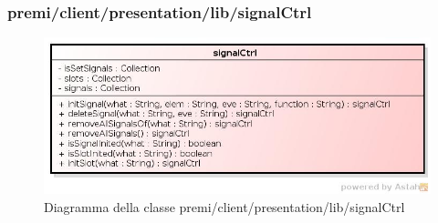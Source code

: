 \subsubsection{premi/client/presentation/lib/signalCtrl}
\begin{figure}[H]
\begin{center}
\includegraphics[scale=0.55]{img/diacla/signalCtrl.jpg}
\caption{Diagramma della classe premi/client/presentation/lib/signalCtrl}
\end{center}
\end{figure}


